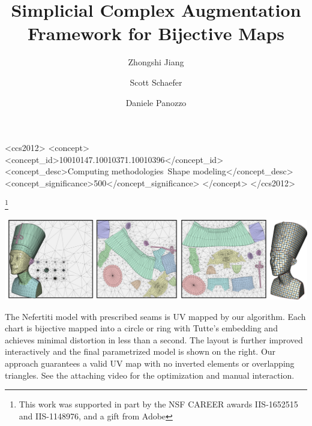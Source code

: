 \documentclass[acmtog]{acmart}
\begin{document}
\title{Simplicial Complex Augmentation Framework for Bijective Maps}


\author{Zhongshi Jiang}

 \author{Scott Schaefer}


 \author{Daniele Panozzo}


\renewcommand{\shortauthors}{Z. Jiang et. al.}
\newcommand{\revise}[1]{#1}
\renewcommand{\revision}[1]{#1}


\begin{CCSXML}
<ccs2012>
<concept>
<concept_id>10010147.10010371.10010396</concept_id>
<concept_desc>Computing methodologies~Shape modeling</concept_desc>
<concept_significance>500</concept_significance>
</concept>
</ccs2012>
\end{CCSXML}

%
% 
%

\thanks{This work was supported in part by the NSF CAREER awards IIS-1652515 and IIS-1148976, and a gift from Adobe}

\begin{teaserfigure}
    \center
   \includegraphics[width=\textwidth]{figs/teaser}
   \caption{The Nefertiti model with prescribed seams is UV mapped by our algorithm. Each chart is bijective mapped into a circle or ring with Tutte's embedding and achieves minimal distortion in less than a second. The layout is further improved interactively and the final parametrized model is shown on the right. Our approach guarantees a valid UV map with no inverted elements or overlapping triangles. See the attaching video for the optimization and manual interaction.
	}
   \label{scaf:fig:teaser}
\end{teaserfigure}



\maketitle




%





\end{document}
